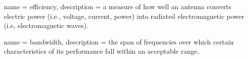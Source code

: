 {
    name = efficiency,
    description = {a measure of how well an antenna converts electric power (i.e., voltage, current, power) into radiated electromagnetic power (i.e, electromagnetic waves).}
}

{
    name = bandwidth,
    description = {the span of frequencies over which certain characteristics of its performance fall within an acceptable range.}
}

